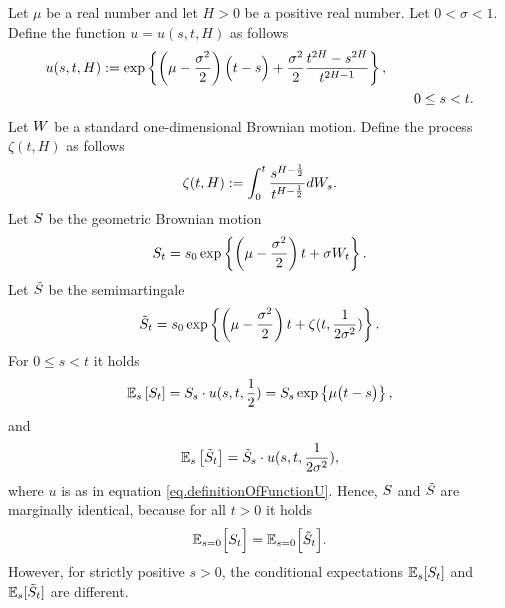 \documentclass[10pt,a4paper]{article}
\begin{document}
\begin{example} \label{example.LTIPisNotMarginallyRobust}
Let $\mu$ be a real number and let $H>0$ be a positive real number. Let $0< \sigma < 1$. Define the function $u=u(s,t,H)$ as follows
\begin{equation}\label{eq.definitionOfFunctionU}
\begin{split}
u(s,t,H):= \exp \left\lbrace
\left(\mu - \frac{\sigma\squared}{2}\right)\Big(t-s\Big)
+\frac{\sigma\squared}{2} \frac{t^{2H} - s^{2H}}{t^{2H-1} }
\right\rbrace,&\\
&\qquad 0\leq s < t.
\end{split}
\end{equation} 
Let $\brownianMotion$ be a standard one-dimensional Brownian motion. Define the process $\zeta(t,H)$ as follows
\begin{equation*}
\zeta(t,H):=\intzerot \frac{s^{H-\half}}{t^{H-\half} }d\brownianMotion_s.
\end{equation*}
Let $\fundamentalPrice$ be the geometric Brownian motion
\begin{equation*}
\fundamentalPrice_t = s_0 \exp\left\lbrace \left(\mu - \frac{\sigma\squared}{2}\right)t + \sigma \brownianMotion_t \right\rbrace.
\end{equation*}
Let $\tilde{\fundamentalPrice}$ be the semimartingale 
\begin{equation*}
\tilde{\fundamentalPrice}_t = s_0 \exp\left\lbrace \left(\mu - \frac{\sigma\squared}{2}\right)t + \zeta(t,\frac{1}{2\sigma\squared}) \right\rbrace.
\end{equation*}
For $0\leq s < t$ it holds
\begin{equation}\label{eq.conditionalMarginalExpectationsIntheCounterExampleGBM}
\Expectation_s \left[ \fundamentalPrice_t\right] = \fundamentalPrice_s \cdot  u(s,t,\half) = \fundamentalPrice_s \exp\left\lbrace \mu \big(t-s\big)\right\rbrace,
\end{equation}
and 
\begin{equation}\label{eq.conditionalMarginalExpectationsIntheCounterExample}
\Expectation_s \left[ \tilde{\fundamentalPrice}_t\right] = \tilde{\fundamentalPrice}_s \cdot  u(s,t,\frac{1}{2\sigma\squared}) ,
\end{equation}
where $u$ is as in equation \eqref{eq.definitionOfFunctionU}. Hence, $\fundamentalPrice$ and $\tilde{\fundamentalPrice}$ are marginally identical, because for all $t>0$ it holds 
\begin{equation*}
\Expectation_{s=0} \Big[\fundamentalPrice_{t}\Big] = \Expectation_{s=0} \Big[\tilde{\fundamentalPrice}_{t}\Big] .
\end{equation*}
However, for strictly positive $s>0$, the conditional expectations $\Expectation_s [\fundamentalPrice_t]$ and $\Expectation_s [\tilde{\fundamentalPrice}_t]$ are different. 


\end{example}
\end{document}
